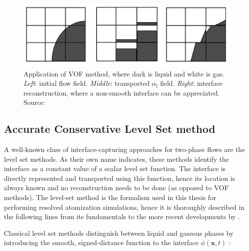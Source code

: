 \begin{figure}[h!]
	\centering
	\includegraphics[scale=0.5]{./part1_numerical_approaches/figures_ch2/VOF}
	\caption[Application of VOF method]{Application of VOF method, where dark is liquid and white is gas. \textsl{Left}: initial flow field. \textsl{Middle}: transported $\alpha_\mathrm{l}$ field. \textsl{Right}: interface reconstruction, where a non-smooth interface can be appreciated. Source: }
	\label{fig:VOF_illustration_drawback}
\end{figure}


\subsection{Accurate Conservative Level Set method}
\label{subsec:ch2_ACLS}



A well-known class of interface-capturing approaches for two-phase flows are the level set methods. As their own name indicates, these methods identify the interface as a constant value of a scalar level set function. The interface is directly represented and transported using this function, hence its location is always known and no reconstruction needs to be done (as opposed to VOF methods). The level-set method is the formalism used in this thesis for performing resolved atomization simulations, hence it is thoroughly described in the following lines from its fundamentals to the more recent developments by .

Classical level set methods  distinguish between liquid and gaseous phases by introducing the smooth, signed-distance function to the interface $\phi(\textbf{x},t)$ :

